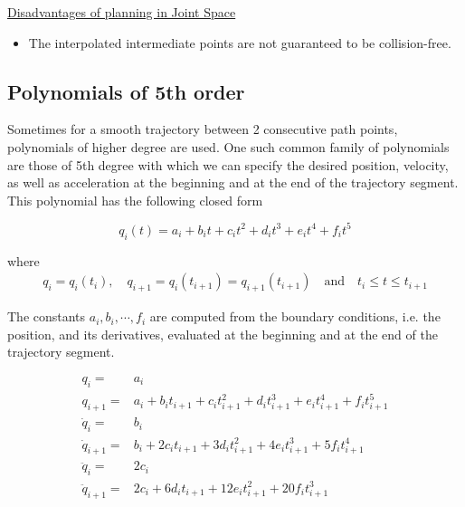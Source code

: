 \underline{Disadvantages of planning in Joint Space}
\begin{itemize}
\item The interpolated intermediate points are not guaranteed to be collision-free.
\end{itemize}



\subsection{Polynomials of 5th order}
\label{section-polynomials-5}

Sometimes for a smooth trajectory between 2 consecutive path points, polynomials of higher degree are used. One such common family of polynomials are those of 5th degree with which we can specify the desired 
position, velocity, as well as acceleration at the beginning and at the end of the trajectory segment. This polynomial has the following closed form

\begin{equation}
q_i(t) = a_i + b_it + c_it^2 + d_it^3 + e_it^4 + f_it^5
\end{equation}

where
\begin{equation}
\begin{gathered}
q_i = q_i(t_i), \quad q_{i+1} = q_i(t_{i+1}) = q_{i+1}(t_{i+1}) \quad \textrm{and} \quad t_i \leq t \leq t_{i+1}
\end{gathered}
\end{equation}

The constants $a_i, b_i, \cdots, f_i$ are computed from the boundary conditions, i.e. the position, and its derivatives, evaluated at the beginning and at the end of the trajectory segment.

\begin{equation}
\label{polynomial5th-bound-conditions-eq}
\begin{aligned}
q_i ={}& a_i \\
q_{i+1} ={}& a_i + b_it_{i+1} + c_it_{i+1}^2 + d_it_{i+1}^3 + e_it_{i+1}^4 + f_it_{i+1}^5 \\
\dot{q}_i ={}& b_i \\ 
\dot{q}_{i+1} ={}& b_i + 2c_it_{i+1} + 3d_it_{i+1}^2 + 4e_it_{i+1}^3 + 5f_it_{i+1}^4 \\
\ddot{q}_i ={}& 2c_i \\
\ddot{q}_{i+1} ={}& 2c_i + 6d_it_{i+1} + 12e_it_{i+1}^2 + 20f_it_{i+1}^3
\end{aligned}
\end{equation}

